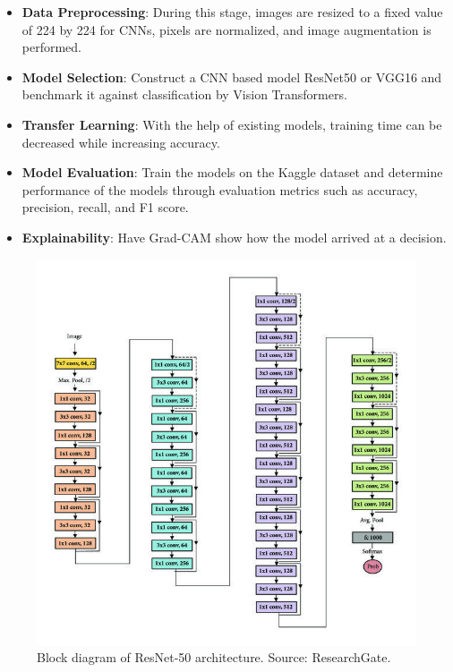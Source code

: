 \documentclass[10pt,twocolumn,letterpaper]{article}
\begin{document}
\begin{itemize}
    \item \textbf{Data Preprocessing}: During this stage, images are resized to a fixed value of 224 by 224 for CNNs, pixels are normalized, and image augmentation is performed.
    \item \textbf{Model Selection}: Construct a CNN based model ResNet50 or VGG16 and benchmark it against classification by Vision Transformers.
    \item \textbf{Transfer Learning}: With the help of existing models, training time can be decreased while increasing accuracy.
    \item \textbf{Model Evaluation}: Train the models on the Kaggle dataset and determine performance of the models through evaluation metrics such as accuracy, precision, recall, and F1 score.
    \item \textbf{Explainability}: Have Grad-CAM show how the model arrived at a decision.
\end{itemize}

\begin{figure}[H]
    \centering
    \includegraphics[width=0.9\linewidth]{Block-diagram-of-Resnet-50-1-by-2-architecture.png}
    \captionsetup{aboveskip=2pt, belowskip=2pt} %
    \caption{Block diagram of ResNet-50 architecture. Source: ResearchGate.}
    \label{fig:resnet_architecture}
\end{figure}
\end{document}

